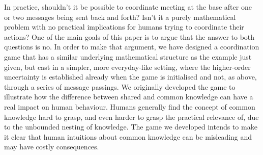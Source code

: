 \documentclass[twocolumn,a4paper,superscriptaddress,nofootinbib]{revtex4}
\begin{document}
In practice, shouldn't it be possible to coordinate meeting at the base after one or two messages being sent back and forth? Isn't it a purely mathematical problem with no practical implications for humans trying to coordinate their actions? One of the main goals of this paper is to argue that the answer to both questions is no. In order to make that argument, we have designed a coordination game that has a similar underlying mathematical structure as the example just given, but cast in a simpler, more everyday-like setting, where the higher-order uncertainty is established already when the game is initialised and not, as above, through a series of message passings. We originally developed the game to illustrate how the difference between shared and common knowledge can have a real impact on human behaviour. Humans generally find the concept of common knowledge hard to grasp, and even harder to grasp the practical relevance of, due to the unbounded nesting of knowledge.  The game we developed intends to make it clear that human intuitions about common knowledge can be misleading and may have costly consequences.
\end{document}
